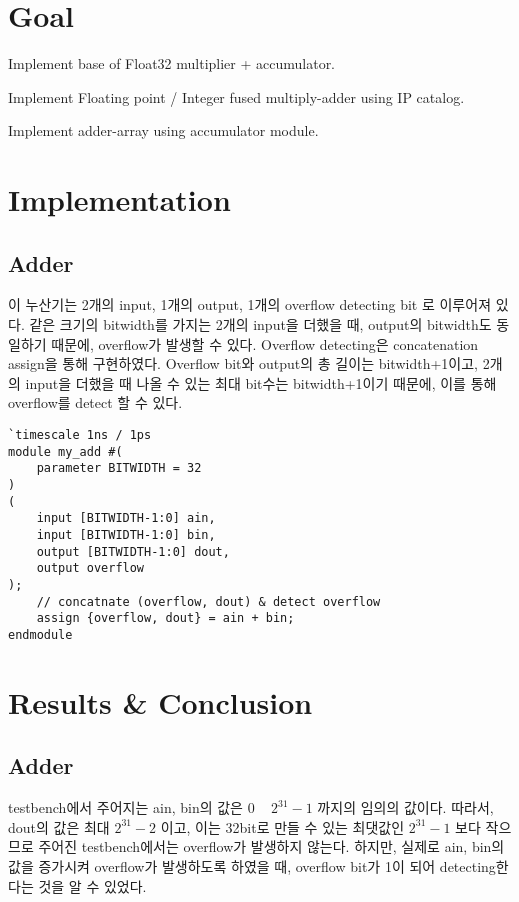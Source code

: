\documentclass{article}
\begin{document}
\pagestyle{fancy}

\section*{Goal}

\begin{itemize*}
\item Implement base of Float32 multiplier + accumulator.
\item Implement Floating point / Integer fused multiply-adder using IP catalog.
\item Implement adder-array using accumulator module.
\end{itemize*}

\section{Implementation}

\subsection{Adder}

이 누산기는 2개의 input, 1개의 output, 1개의 overflow detecting bit 로 이루어져 있다.
같은 크기의 bitwidth를 가지는 2개의 input을 더했을 때, output의 bitwidth도 동일하기 때문에, overflow가 발생할 수 있다.
Overflow detecting은 concatenation assign을 통해 구현하였다.
Overflow bit와 output의 총 길이는 bitwidth+1이고, 2개의 input을 더했을 때 나올 수 있는 최대 bit수는 bitwidth+1이기 때문에, 이를 통해 overflow를 detect 할 수 있다.

\begin{lstlisting}[style={verilog-style}]
`timescale 1ns / 1ps
module my_add #(
    parameter BITWIDTH = 32
)
(
    input [BITWIDTH-1:0] ain,
    input [BITWIDTH-1:0] bin,
    output [BITWIDTH-1:0] dout,
    output overflow
);
    // concatnate (overflow, dout) & detect overflow
    assign {overflow, dout} = ain + bin;
endmodule
\end{lstlisting}

\section{Results \& Conclusion}

\subsection{Adder}
testbench에서 주어지는 ain, bin의 값은 0 ~ $2^{31}-1$ 까지의 임의의 값이다.
따라서, dout의 값은 최대 $2^{31}-2$  이고, 이는 32bit로 만들 수 있는 최댓값인 $2^{31}-1$  보다 작으므로 주어진 testbench에서는 overflow가 발생하지 않는다.
하지만, 실제로 ain, bin의 값을 증가시켜 overflow가 발생하도록 하였을 때, overflow bit가 1이 되어 detecting한다는 것을 알 수 있었다.
\end{document}
